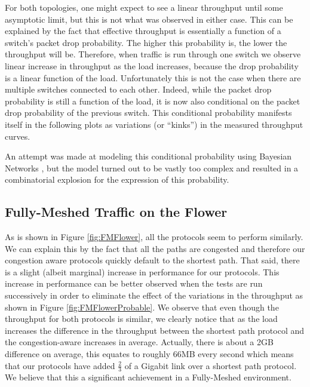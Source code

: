 For both topologies, one might expect to see a linear throughput until some asymptotic limit, but this is not what was observed in either case. This can be explained by the fact that effective throughput is essentially a function of a switch's packet drop probability. The higher this probability is, the lower the throughput will be. Therefore, when traffic is run through one switch we observe linear increase in throughput as the load increases, because the drop probability is a linear function of the load. Unfortunately this is not the case when there are multiple switches connected to each other. Indeed, while the packet drop probability is still a function of the load, it is now also conditional on the packet drop probability of the previous switch. This conditional probability manifests itself in the following plots as variations (or ``kinks'') in the measured throughput curves.

An attempt was made at modeling this conditional probability using Bayesian Networks \cite{BayesNetwork}, but the model turned out to be vastly too complex and resulted in a combinatorial explosion for the expression of this probability.


\subsection{Fully-Meshed Traffic on the Flower}


As is shown in Figure \ref{fig:FMFlower}, all the protocols seem to perform similarly. We can explain this by the fact that all the paths are congested and therefore our congestion aware protocols quickly default to the shortest path. That said, there is a slight (albeit marginal) increase in performance for our protocols. This increase in performance can be better observed when the tests are run successively in order to eliminate the effect of the variations in the throughput as shown in Figure \ref{fig:FMFlowerProbable}. We observe that even though the throughput for both protocols is similar, we clearly notice that as the load increases the difference in the throughput between the shortest path protocol and the congestion-aware increases in average. Actually, there is about a 2GB difference on average, this equates to roughly 66MB every second which means that our protocols have added $\frac{2}{3}$ of a Gigabit link over a shortest path protocol. We believe that this a significant achievement in a Fully-Meshed environment.

